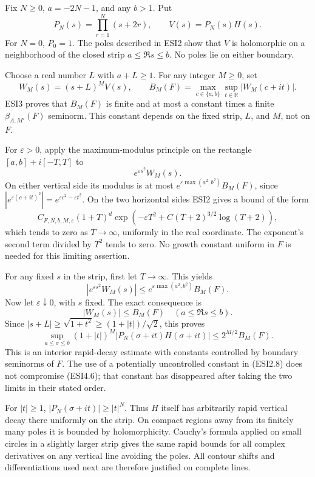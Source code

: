 Fix \(N\ge0\), \(a=-2N-1\), and any \(b>1\). Put \[
P_N(s)=\prod_{r=1}^N(s+2r),\qquad V(s)=P_N(s)H(s).
\tag{ESI4.1}
\] For \(N=0\), \(P_0=1\). The poles described in ESI2 show that \(V\)
is holomorphic on a neighborhood of the closed strip \(a\le\Re s\le b\).
No poles lie on either boundary.

Choose a real number \(L\) with \(a+L\ge1\). For any integer \(M\ge0\),
set \[
W_M(s)=(s+L)^M V(s),\qquad
B_M(F)=\max_{c\in\{a,b\}}\sup_{t\in\mathbb R}|W_M(c+it)|.
\tag{ESI4.2}
\] ESI3 proves that \(B_M(F)\) is finite and at most a constant times a
finite \(\beta_{A,M'}(F)\) seminorm. This constant depends on the fixed
strip, \(L\), and \(M\), not on \(F\).

For \(\varepsilon>0\), apply the maximum-modulus principle on the
rectangle \([a,b]+i[-T,T]\) to \[
e^{\varepsilon s^2}W_M(s).
\tag{ESI4.3}
\] On either vertical side its modulus is at most
\(e^{\varepsilon\max(a^2,b^2)}B_M(F)\), since
\(|e^{\varepsilon(c+it)^2}|=e^{\varepsilon c^2-\varepsilon t^2}\). On
the two horizontal sides ESI2 gives a bound of the form \[
C_{F,N,b,M,\varepsilon}(1+T)^d
\exp\!\left(-\varepsilon T^2+C(T+2)^{3/2}\log(T+2)\right),
\tag{ESI4.4}
\] which tends to zero as \(T\to\infty\), uniformly in the real
coordinate. The exponent's second term divided by \(T^2\) tends to zero.
No growth constant uniform in \(F\) is needed for this limiting
assertion.

For any fixed \(s\) in the strip, first let \(T\to\infty\). This yields
\[
|e^{\varepsilon s^2}W_M(s)|
\le e^{\varepsilon\max(a^2,b^2)}B_M(F).
\] Now let \(\varepsilon\downarrow0\), with \(s\) fixed. The exact
consequence is \[
|W_M(s)|\le B_M(F)\quad(a\le\Re s\le b).
\tag{ESI4.5}
\] Since \(|s+L|\ge\sqrt{1+t^2}\ge(1+|t|)/\sqrt2\), this proves \[
\sup_{a\le\sigma\le b}(1+|t|)^M|P_N(\sigma+it)H(\sigma+it)|
\le2^{M/2}B_M(F).
\tag{ESI4.6}
\] This is an interior rapid-decay estimate with constants controlled by
boundary seminorms of \(F\). The use of a potentially uncontrolled
constant in (ESI2.8) does not compromise (ESI4.6); that constant has
disappeared after taking the two limits in their stated order.

For \(|t|\ge1\), \(|P_N(\sigma+it)|\ge|t|^N\). Thus \(H\) itself has
arbitrarily rapid vertical decay there uniformly on the strip. On
compact regions away from its finitely many poles it is bounded by
holomorphicity. Cauchy's formula applied on small circles in a slightly
larger strip gives the same rapid bounds for all complex derivatives on
any vertical line avoiding the poles. All contour shifts and
differentiations used next are therefore justified on complete lines.

